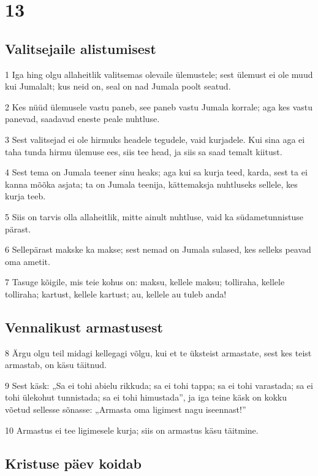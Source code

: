 \chapter{13}

\section*{Valitsejaile alistumisest}

\par 1 Iga hing olgu allaheitlik valitsemas olevaile ülemustele; sest ülemust ei ole muud kui Jumalalt; kus neid on, seal on nad Jumala poolt seatud.
\par 2 Kes nüüd ülemusele vastu paneb, see paneb vastu Jumala korrale; aga kes vastu panevad, saadavad eneste peale nuhtluse.
\par 3 Sest valitsejad ei ole hirmuks headele tegudele, vaid kurjadele. Kui sina aga ei taha tunda hirmu ülemuse ees, siis tee head, ja siis sa saad temalt kiitust.
\par 4 Sest tema on Jumala teener sinu heaks; aga kui sa kurja teed, karda, sest ta ei kanna mõõka asjata; ta on Jumala teenija, kättemaksja nuhtluseks sellele, kes kurja teeb.
\par 5 Siis on tarvis olla allaheitlik, mitte ainult nuhtluse, vaid ka südametunnistuse pärast.
\par 6 Sellepärast makske ka makse; sest nemad on Jumala sulased, kes selleks peavad oma ametit.
\par 7 Tasuge kõigile, mis teie kohus on: maksu, kellele maksu; tolliraha, kellele tolliraha; kartust, kellele kartust; au, kellele au tuleb anda!

\section*{Vennalikust armastusest}

\par 8 Ärgu olgu teil midagi kellegagi võlgu, kui et te üksteist armastate, sest kes teist armastab, on käsu täitnud.
\par 9 Sest käsk: „Sa ei tohi abielu rikkuda; sa ei tohi tappa; sa ei tohi varastada; sa ei tohi ülekohut tunnistada; sa ei tohi himustada”, ja iga teine käsk on kokku võetud sellesse sõnasse: „Armasta oma ligimest nagu iseennast!”
\par 10 Armastus ei tee ligimesele kurja; siis on armastus käsu täitmine.

\section*{Kristuse päev koidab}

